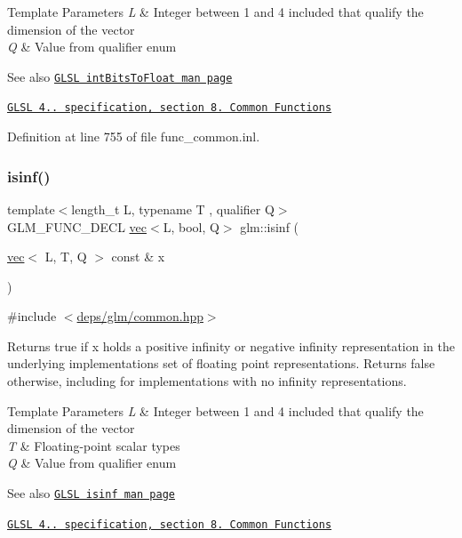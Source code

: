 \begin{DoxyTemplParams}{Template Parameters}
{\em L} & Integer between 1 and 4 included that qualify the dimension of the vector \\
\hline
{\em Q} & Value from qualifier enum\\
\hline
\end{DoxyTemplParams}
\begin{DoxySeeAlso}{See also}
\href{http://www.opengl.org/sdk/docs/manglsl/xhtml/intBitsToFloat.xml}{\tt G\+L\+SL int\+Bits\+To\+Float man page} 

\href{http://www.opengl.org/registry/doc/GLSLangSpec.4.20.8.pdf}{\tt G\+L\+SL 4.. specification, section 8. Common Functions} 
\end{DoxySeeAlso}


Definition at line 755 of file func\+\_\+common.\+inl.

\mbox{\label{group__core__func__common_ga2885587c23a106301f20443896365b62}} 
\subsubsection{\texorpdfstring{isinf()}{isinf()}}
{\footnotesize\ttfamily template$<$length\+\_\+t L, typename T , qualifier Q$>$ \\
G\+L\+M\+\_\+\+F\+U\+N\+C\+\_\+\+D\+E\+CL \hyperlink{structglm_1_1vec}{vec}$<$L, bool, Q$>$ glm\+::isinf (\begin{DoxyParamCaption}\item[{\hyperlink{structglm_1_1vec}{vec}$<$ L, T, Q $>$ const \&}]{x }\end{DoxyParamCaption})}



{\ttfamily \#include $<$\hyperlink{common_8hpp}{deps/glm/common.\+hpp}$>$}

Returns true if x holds a positive infinity or negative infinity representation in the underlying implementation\textquotesingle{}s set of floating point representations. Returns false otherwise, including for implementations with no infinity representations.


\begin{DoxyTemplParams}{Template Parameters}
{\em L} & Integer between 1 and 4 included that qualify the dimension of the vector \\
\hline
{\em T} & Floating-\/point scalar types \\
\hline
{\em Q} & Value from qualifier enum\\
\hline
\end{DoxyTemplParams}
\begin{DoxySeeAlso}{See also}
\href{http://www.opengl.org/sdk/docs/manglsl/xhtml/isinf.xml}{\tt G\+L\+SL isinf man page} 

\href{http://www.opengl.org/registry/doc/GLSLangSpec.4.20.8.pdf}{\tt G\+L\+SL 4.. specification, section 8. Common Functions} 
\end{DoxySeeAlso}


